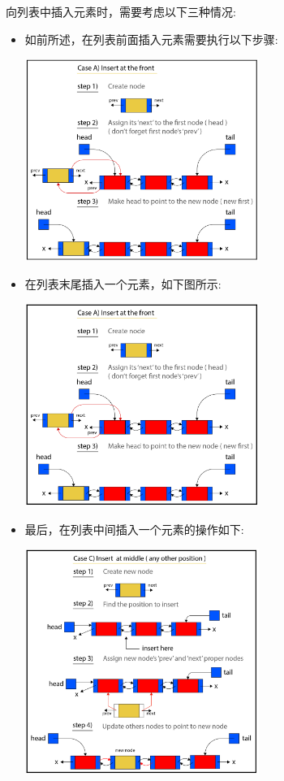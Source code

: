 向列表中插入元素时，需要考虑以下三种情况: \par

\begin{itemize}
	\item 如前所述，在列表前面插入元素需要执行以下步骤: \par
	\begin{center}
		\includegraphics[width=0.6\textwidth]{content/Section-2/Chapter-6/6}
	\end{center}
	\item 在列表末尾插入一个元素，如下图所示: \par
	\begin{center}
		\includegraphics[width=0.6\textwidth]{content/Section-2/Chapter-6/7}
	\end{center}
	\item 最后，在列表中间插入一个元素的操作如下: \par
	\begin{center}
		\includegraphics[width=0.6\textwidth]{content/Section-2/Chapter-6/8}
	\end{center}
\end{itemize}

